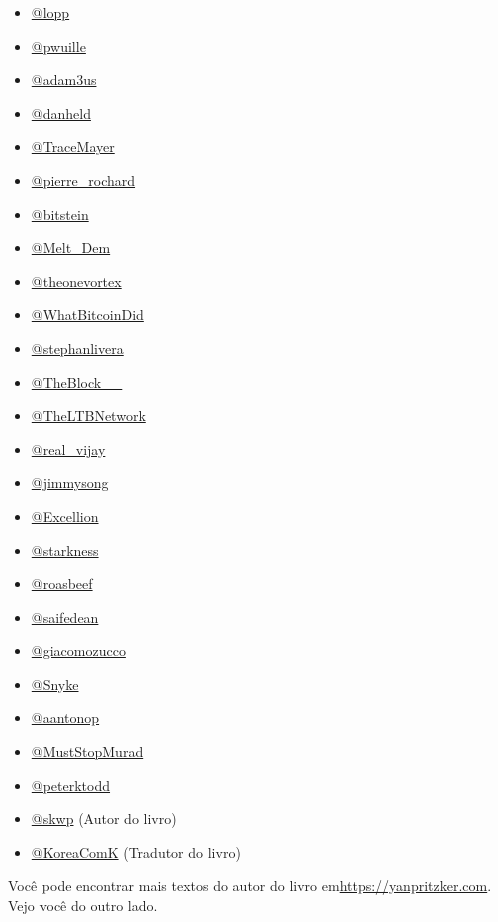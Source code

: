 \begin{itemize}
\item \href{https://twitter.com/lopp}{@lopp}
\item \href{https://twitter.com/pwuille}{@pwuille}
\item \href{https://twitter.com/adam3us}{@adam3us}
\item \href{https://twitter.com/danheld}{@danheld}
\item \href{https://twitter.com/TraceMayer}{@TraceMayer}
\item \href{https://twitter.com/pierre_rochard}{@pierre\_rochard}
\item \href{https://twitter.com/bitstein}{@bitstein}
\item \href{https://twitter.com/Melt_Dem}{@Melt\_Dem}
\item \href{https://twitter.com/theonevortex}{@theonevortex}
\item \href{https://twitter.com/WhatBitcoinDid}{@WhatBitcoinDid}
\item \href{https://twitter.com/stephanlivera}{@stephanlivera}
\item \href{https://twitter.com/TheBlock__}{@TheBlock\_\_}
\item \href{https://twitter.com/TheLTBNetwork}{@TheLTBNetwork}
\item \href{https://twitter.com/real_vijay}{@real\_vijay}
\item \href{https://twitter.com/jimmysong}{@jimmysong}
\item \href{https://twitter.com/Excellion}{@Excellion}
\item \href{https://twitter.com/starkness}{@starkness}
\item \href{https://twitter.com/roasbeef}{@roasbeef}
\item \href{https://twitter.com/saifedean}{@saifedean}
\item \href{https://twitter.com/giacomozucco}{@giacomozucco}
\item \href{https://twitter.com/Snyke}{@Snyke}
\item \href{https://twitter.com/aantonop}{@aantonop}
\item \href{https://twitter.com/MustStopMurad}{@MustStopMurad}
\item \href{https://twitter.com/peterktodd}{@peterktodd}
\item \href{https://twitter.com/skwp}{@skwp} (Autor do livro)
\item \href{https://twitter.com/KoreaComK}{@KoreaComK} (Tradutor do livro)
\end{itemize}

Você pode encontrar mais textos do autor do livro em\newline \url{https://yanpritzker.com}. Vejo você do outro lado.